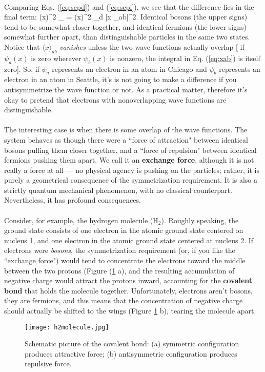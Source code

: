 \paragraph{}
Comparing Eqs. (\ref{eq:sepd}) and (\ref{eq:sepi}), we see that the difference lies in the final term:
\be
\langle (\Delta x)^2 \rangle_{\pm} = \langle (\Delta x)^2 \rangle_d |\langle x \rangle_{ab}|^2.
\ee
Identical bosons (the upper signs) tend to be somewhat closer together, and identical fermions (the lower signs) somewhat further apart, than distinguishable particles in the same two states.		 Notice that $\langle x \rangle_{ab}$ \textit{vanishes} unless the two wave functions actually overlap [ if $\psi_a(x)$ is zero wherever $\psi_b(x)$ is nonzero, the integral in 
Eq. (\ref{eq:xab})	is itself zero]. So, if $\psi_a$ represents an electron in an atom in Chicago and $\psi_b$ represents an
electron in an atom in Seattle, it's is not going to make a difference if you antisymmetrize the wave function or not. As 
a practical matter, therefore it's okay to pretend that electrons with nonoverlapping wave functions are distinguishable.

\paragraph{}
The interesting case is when there is some overlap of the wave functions. The system behaves as though there were a ``force
of attraction" between identical bosons pulling them closer together, and a ``force of repulsion" between identical fermions pushing them apart. We call it an {\bf exchange force}, although it is not really a force at all --- no physical agency is pushing on the particles; rather, it is purely a geometrical consequence of the symmetrization requirement. It is also a strictly quantum mechanical phenomenon, with no classical counterpart. Nevertheless, it has profound consequences. 

\paragraph{}
Consider, for example, the hydrogen molecule (H$_2$). Roughly speaking, the ground state consists of one electron in the atomic ground state centered on nucleus 1, and one electron in the atomic ground state centered at nucleus 2. If electrons were 
\textit{bosons}, the symmetrization requirement (or, if you like the ``exchange force") would tend to concentrate the electrons toward the middle between the two protons (Figure (\ref{fig:h2} a), and the resulting accumulation of negative charge would attract the protons inward, accounting for the {\bf covalent bond} that holds the molecule together. 
Unfortunately, electrons aren't bosons, they are fermions, and this means that the concentration of negative charge should
actually be shifted to the wings (Figure \ref{fig:h2} b), tearing the molecule apart.
\begin{figure}[!ht]
	\centering
	\texttt{[image: h2molecule.jpg]}
	\caption{Schematic picture of the covalent bond: (a) symmetric configuration produces attractive force; (b) antisymmetric configuration produces repulsive force.}
	\label{fig:h2}
\end{figure}

